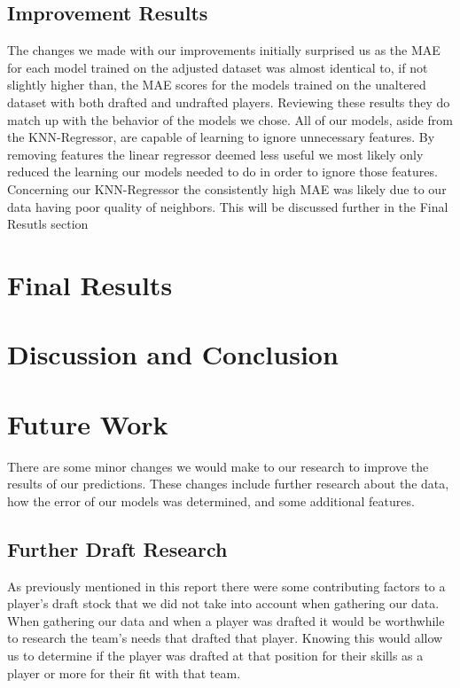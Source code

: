 \documentclass{article}
\begin{document}
\subsection{Improvement Results}
The changes we made with our improvements initially surprised us as the MAE for each model trained 
on the adjusted dataset was almost identical to, if not slightly higher than, the MAE scores for the models trained on the unaltered 
dataset with both drafted and undrafted players. Reviewing these results they do match up with the 
behavior of the models we chose. All of our models, aside from the KNN-Regressor, are capable of learning 
to ignore unnecessary features. By removing features the linear regressor deemed less useful we most likely only reduced 
the learning our models needed to do in order to ignore those features.
Concerning our KNN-Regressor the consistently high MAE was likely due to our data having poor quality of neighbors. This 
will be discussed further in the Final Resutls section

\section{Final Results}

\section{Discussion and Conclusion}

\section{Future Work}

There are some minor changes we would make to our research to improve the
results of our predictions. These changes include further research about the
data, how the error of our models was determined, and some additional features.

\subsection{Further Draft Research}

As previously mentioned in this report there were some contributing factors to a
player’s draft stock that we did not take into account when gathering our data.
When gathering our data and when a player was drafted it would be worthwhile to
research the team’s needs that drafted that player. Knowing this would allow us
to determine if the player was drafted at that position for their skills as a
player or more for their fit with that team.
\end{document}
